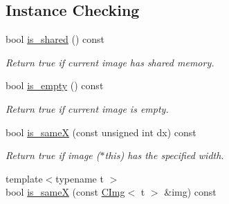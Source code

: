 \subsection*{Instance Checking}
\label{_amgrp918c881546642d9874d6c788f92e19cb}
 \begin{DoxyCompactItemize}
\item 
\hypertarget{structcimg__library_1_1CImg_a89c9d2adf59c941c548b2dbb85d9224d}{
bool \hyperlink{structcimg__library_1_1CImg_a89c9d2adf59c941c548b2dbb85d9224d}{is\_\-shared} () const }
\label{structcimg__library_1_1CImg_a89c9d2adf59c941c548b2dbb85d9224d}

\begin{DoxyCompactList}\small\item\em Return {\ttfamily true} if current image has shared memory. \item\end{DoxyCompactList}\item 
\hypertarget{structcimg__library_1_1CImg_acef8e33cfd36a5d7d2fad939efcf02e3}{
bool \hyperlink{structcimg__library_1_1CImg_acef8e33cfd36a5d7d2fad939efcf02e3}{is\_\-empty} () const }
\label{structcimg__library_1_1CImg_acef8e33cfd36a5d7d2fad939efcf02e3}

\begin{DoxyCompactList}\small\item\em Return {\ttfamily true} if current image is empty. \item\end{DoxyCompactList}\item 
\hypertarget{structcimg__library_1_1CImg_a3b72aa78538551f0df216de7f6ea2e95}{
bool \hyperlink{structcimg__library_1_1CImg_a3b72aa78538551f0df216de7f6ea2e95}{is\_\-sameX} (const unsigned int dx) const }
\label{structcimg__library_1_1CImg_a3b72aa78538551f0df216de7f6ea2e95}

\begin{DoxyCompactList}\small\item\em Return {\ttfamily true} if image ($\ast$this) has the specified width. \item\end{DoxyCompactList}\item 
\hypertarget{structcimg__library_1_1CImg_a420cd1cddf318f832126b10403aef4fd}{
{\footnotesize template$<$typename t $>$ }\\bool \hyperlink{structcimg__library_1_1CImg_a420cd1cddf318f832126b10403aef4fd}{is\_\-sameX} (const \hyperlink{structcimg__library_1_1CImg}{CImg}$<$ t $>$ \&img) const }
\label{structcimg__library_1_1CImg_a420cd1cddf318f832126b10403aef4fd}


\end{DoxyCompactItemize}
